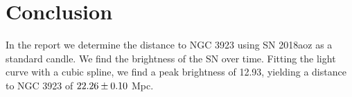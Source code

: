 \documentclass[11pt, oneside]{article}   	%
\begin{document}
\section{Conclusion}\label{conclusion}
In the report we determine the distance to NGC 3923 using SN 2018aoz as a standard candle.
We find the brightness of the SN over time. 
Fitting the light curve with a cubic spline, we find a peak brightness of 12.93, yielding a distance to NGC 3923 of $\rm{22.26 \pm 0.10}$ Mpc.



\end{document}
